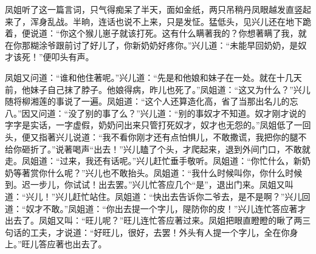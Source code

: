 \begin{parag}


    凤姐听了这一篇言词，只气得痴呆了半天，面如金纸，两只吊稍丹凤眼越发直竖起来了，浑身乱战。半晌，连话也说不上来，只是发怔。猛低头，见兴儿还在地下跪着，便说道：“你这个猴儿崽子就该打死。这有什么瞒著我的？你想著瞒了我，就在你那糊涂爷跟前讨了好儿了，你新奶奶好疼你。”兴儿道：“未能早回奶奶，是奴才该死！”便叩头有声。
\end{parag}


\begin{parag}


    凤姐又问道：“谁和他住著呢。”兴儿道：“先是和他娘和妹子在一处。就在十几天前，他妹子自己抹了脖子。他娘得病，昨儿也死了。”凤姐道：“这又为什么？”兴儿随将柳湘莲的事说了一遍。凤姐道：“这个人还算造化高，省了当那出名儿的忘八。”因又问道：“没了别的事了么？”兴儿道：“别的事奴才不知道。奴才刚才说的字字是实话，一字虚假，奶奶问出来只管打死奴才，奴才也无怨的。”凤姐低了一回头，便又指著兴儿说道：“我不看你刚才还有点怕惧儿，不敢撒谎，我把你的腿不给你砸折了。”说著喝声“出去！”兴儿瞌了个头，才爬起来，退到外间门口，不敢就走。凤姐道：“过来，我还有话呢。”兴儿赶忙垂手敬听。凤姐道：“你忙什么，新奶奶等著赏你什么呢？”兴儿也不敢抬头。凤姐道：“我什么时候叫你，你什么时候到。迟一步儿，你试试！出去罢。”兴儿忙答应几个“是”，退出门来。凤姐又叫道：“兴儿！”兴儿赶忙站住。凤姐道：“快出去告诉你二爷去，是不是啊？”兴儿回道：“奴才不敢。”凤姐道：“你出去提一个字儿，隄防你的皮！”兴儿连忙答应著才出去了。凤姐又叫：“旺儿呢？”旺儿连忙答应著过来。凤姐把眼直瞪瞪的瞅了两三句话的工夫，才说道：“好旺儿，很好，去罢！外头有人提一个字儿，全在你身上。”旺儿答应著也出去了。
\end{parag}


